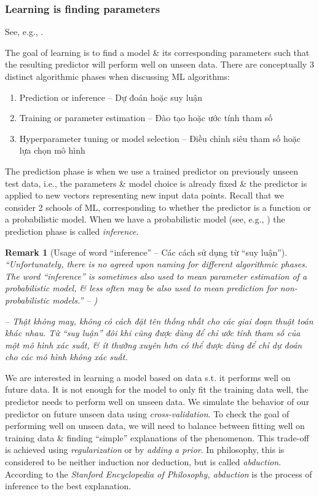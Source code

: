 \documentclass{article}
\newtheorem{remark}{Remark}
\begin{document}

\subsubsection{Learning is finding parameters}
See, e.g., \cite[Chap. 8, Sect. 8.1.4: Learning is Finding Parameters]{Deisenroth_Faisal_Ong2024}.

The goal of learning is to find a model \& its corresponding parameters such that the resulting predictor will perform well on unseen data. There are conceptually 3 distinct algorithmic phases when discussing ML algorithms:
\begin{enumerate}
	\item Prediction or inference -- Dự đoán hoặc suy luận
	\item Training or parameter estimation -- Đào tạo hoặc ước tính tham số
	\item Hyperparameter tuning or model selection -- Điều chỉnh siêu tham số hoặc lựa chọn mô hình
\end{enumerate}
The prediction phase is when we use a trained predictor on previously unseen test data, i.e., the parameters \& model choice is already fixed \& the predictor is applied to new vectors representing new input data points. Recall that we consider 2 schools of ML, corresponding to whether the predictor is a function or a probabilistic model. When we have a probabilistic model (see, e.g., \cite[Sect. 8.4]{Deisenroth_Faisal_Ong2024}) the prediction phase is called {\it inference}.

\begin{remark}[Usage of word ``inference'' -- Các cách sử dụng từ ``suy luận'']
	``Unfortunately, there is no agreed upon naming for different algorithmic phases. The word ``inference'' is sometimes also used to mean parameter estimation of a probabilistic model, \& less often may be also used to mean prediction for non-probabilistic models.'' -- \cite[Rmk, p. 257]{Deisenroth_Faisal_Ong2024})
	
	-- Thật không may, không có cách đặt tên thống nhất cho các giai đoạn thuật toán khác nhau. Từ ``suy luận'' đôi khi cũng được dùng để chỉ ước tính tham số của một mô hình xác suất, \& ít thường xuyên hơn có thể được dùng để chỉ dự đoán cho các mô hình không xác suất.
\end{remark}
We are interested in learning a model based on data s.t. it performs well on future data. It is not enough for the model to only fit the training data well, the predictor needs to perform well on unseen data. We simulate the behavior of our predictor on future unseen data using {\it cross-validation}. To check the goal of performing well on unseen data, we will need to balance between fitting well on training data \& finding ``simple'' explanations of the phenomenon. This trade-off is achieved using {\it regularization} or by {\it adding a prior}. In philosophy, this is considered to be neither induction nor deduction, but is called {\it abduction}. According to the {\it Stanford Encyclopedia of Philosophy, abduction} is the process of inference to the best explanation.
\end{document}
